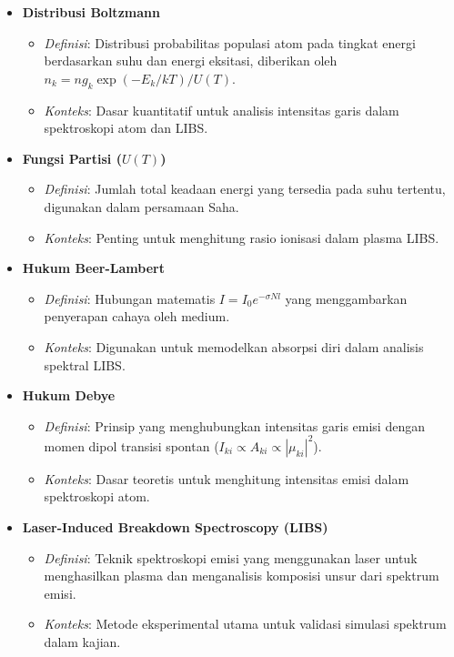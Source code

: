 \documentclass[a4paper,12pt]{article}
\begin{document}
\begin{itemize}
    \item \textbf{Distribusi Boltzmann}  
        \begin{itemize}
            \item \textit{Definisi}: Distribusi probabilitas populasi atom pada tingkat energi berdasarkan suhu dan energi eksitasi, diberikan oleh \(n_k = n g_k \exp(-E_k/kT)/U(T)\).
            \item \textit{Konteks}: Dasar kuantitatif untuk analisis intensitas garis dalam spektroskopi atom dan LIBS.
        \end{itemize}

    \item \textbf{Fungsi Partisi (\(U(T)\))}  
        \begin{itemize}
            \item \textit{Definisi}: Jumlah total keadaan energi yang tersedia pada suhu tertentu, digunakan dalam persamaan Saha.
            \item \textit{Konteks}: Penting untuk menghitung rasio ionisasi dalam plasma LIBS.
        \end{itemize}

    \item \textbf{Hukum Beer-Lambert}  
        \begin{itemize}
            \item \textit{Definisi}: Hubungan matematis \(I = I_0 e^{-\sigma N l}\) yang menggambarkan penyerapan cahaya oleh medium.
            \item \textit{Konteks}: Digunakan untuk memodelkan absorpsi diri dalam analisis spektral LIBS.
        \end{itemize}

    \item \textbf{Hukum Debye}  
        \begin{itemize}
            \item \textit{Definisi}: Prinsip yang menghubungkan intensitas garis emisi dengan momen dipol transisi spontan (\(I_{ki} \propto A_{ki} \propto |\mu_{ki}|^2\)).
            \item \textit{Konteks}: Dasar teoretis untuk menghitung intensitas emisi dalam spektroskopi atom.
        \end{itemize}

    \item \textbf{Laser-Induced Breakdown Spectroscopy (LIBS)}  
        \begin{itemize}
            \item \textit{Definisi}: Teknik spektroskopi emisi yang menggunakan laser untuk menghasilkan plasma dan menganalisis komposisi unsur dari spektrum emisi.
            \item \textit{Konteks}: Metode eksperimental utama untuk validasi simulasi spektrum dalam kajian.
        \end{itemize}


\end{itemize}
\end{document}
